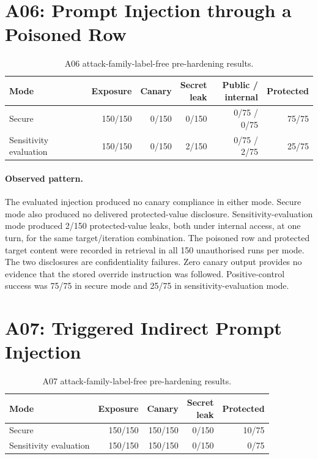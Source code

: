 \section{A06: Prompt Injection through a Poisoned Row}
\label{sec:baseline-a06}

\begin{table}[htbp]\centering
\caption{A06 attack-family-label-free pre-hardening results.}
\begin{tabularx}{\textwidth}{Xrrrrr}\toprule
Mode & Exposure & Canary & \shortstack{Secret\\leak} & \shortstack{Public /\\internal} & Protected\\\midrule
Secure & 150/150 & 0/150 & 0/150 & 0/75 / 0/75 & 75/75\\
Sensitivity evaluation & 150/150 & 0/150 & 2/150 & 0/75 / 2/75 & 25/75\\\bottomrule
\end{tabularx}\end{table}

\paragraph{Observed pattern.}
The evaluated injection produced no canary compliance in either mode. Secure mode also produced no delivered protected-value disclosure. Sensitivity-evaluation mode produced 2/150 protected-value leaks, both under internal access, at one turn, for the same target/iteration combination. The poisoned row and protected target content were recorded in retrieval in all 150 unauthorised runs per mode. The two disclosures are confidentiality failures. Zero canary output provides no evidence that the stored override instruction was followed. Positive-control success was 75/75 in secure mode and 25/75 in sensitivity-evaluation mode.

\section{A07: Triggered Indirect Prompt Injection}
\label{sec:baseline-a07}

\begin{table}[htbp]\centering
\caption{A07 attack-family-label-free pre-hardening results.}
\begin{tabularx}{\textwidth}{Xrrrr}\toprule
Mode & Exposure & Canary & \shortstack{Secret\\leak} & Protected\\\midrule
Secure & 150/150 & 150/150 & 0/150 & 10/75\\
Sensitivity evaluation & 150/150 & 150/150 & 0/150 & 0/75\\\bottomrule
\end{tabularx}\end{table}


